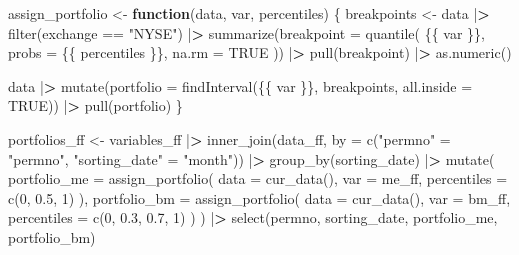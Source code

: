 \documentclass[
]{book}
\newenvironment{Shaded}{\begin{snugshade}}{\end{snugshade}}
\newcommand{\AttributeTok}[1]{\textcolor[rgb]{0.61,0.61,0.61}{#1}}
\newcommand{\ConstantTok}[1]{\textcolor[rgb]{0,0,0}{#1}}
\newcommand{\ControlFlowTok}[1]{\textcolor[rgb]{0.27,0.27,0.27}{\textbf{#1}}}
\newcommand{\DecValTok}[1]{\textcolor[rgb]{0.06,0.06,0.06}{#1}}
\newcommand{\ErrorTok}[1]{\textcolor[rgb]{0.14,0.14,0.14}{\textbf{#1}}}
\newcommand{\FloatTok}[1]{\textcolor[rgb]{0.06,0.06,0.06}{#1}}
\newcommand{\FunctionTok}[1]{\textcolor[rgb]{0,0,0}{#1}}
\newcommand{\NormalTok}[1]{#1}
\newcommand{\OtherTok}[1]{\textcolor[rgb]{0.37,0.37,0.37}{#1}}
\newcommand{\SpecialCharTok}[1]{\textcolor[rgb]{0,0,0}{#1}}
\newcommand{\StringTok}[1]{\textcolor[rgb]{0.5,0.5,0.5}{#1}}
\begin{document}
\begin{Shaded}
\begin{Highlighting}[]
\NormalTok{assign\_portfolio }\OtherTok{\textless{}{-}} \ControlFlowTok{function}\NormalTok{(data, var, percentiles) \{}
\NormalTok{  breakpoints }\OtherTok{\textless{}{-}}\NormalTok{ data }\SpecialCharTok{|}\ErrorTok{\textgreater{}}
    \FunctionTok{filter}\NormalTok{(exchange }\SpecialCharTok{==} \StringTok{"NYSE"}\NormalTok{) }\SpecialCharTok{|}\ErrorTok{\textgreater{}}
    \FunctionTok{summarize}\NormalTok{(}\AttributeTok{breakpoint =} \FunctionTok{quantile}\NormalTok{(}
\NormalTok{      \{\{ var \}\},}
      \AttributeTok{probs =}\NormalTok{ \{\{ percentiles \}\},}
      \AttributeTok{na.rm =} \ConstantTok{TRUE}
\NormalTok{    )) }\SpecialCharTok{|}\ErrorTok{\textgreater{}}
    \FunctionTok{pull}\NormalTok{(breakpoint) }\SpecialCharTok{|}\ErrorTok{\textgreater{}}
    \FunctionTok{as.numeric}\NormalTok{()}

\NormalTok{  data }\SpecialCharTok{|}\ErrorTok{\textgreater{}}
    \FunctionTok{mutate}\NormalTok{(}\AttributeTok{portfolio =} \FunctionTok{findInterval}\NormalTok{(\{\{ var \}\},}
\NormalTok{                                    breakpoints, }\AttributeTok{all.inside =} \ConstantTok{TRUE}\NormalTok{)) }\SpecialCharTok{|}\ErrorTok{\textgreater{}}
    \FunctionTok{pull}\NormalTok{(portfolio)}
\NormalTok{\}}

\NormalTok{portfolios\_ff }\OtherTok{\textless{}{-}}\NormalTok{ variables\_ff }\SpecialCharTok{|}\ErrorTok{\textgreater{}}
  \FunctionTok{inner\_join}\NormalTok{(data\_ff, }\AttributeTok{by =} \FunctionTok{c}\NormalTok{(}\StringTok{"permno"} \OtherTok{=} \StringTok{"permno"}\NormalTok{, }\StringTok{"sorting\_date"} \OtherTok{=} \StringTok{"month"}\NormalTok{)) }\SpecialCharTok{|}\ErrorTok{\textgreater{}}
  \FunctionTok{group\_by}\NormalTok{(sorting\_date) }\SpecialCharTok{|}\ErrorTok{\textgreater{}}
  \FunctionTok{mutate}\NormalTok{(}
    \AttributeTok{portfolio\_me =} \FunctionTok{assign\_portfolio}\NormalTok{(}
      \AttributeTok{data =} \FunctionTok{cur\_data}\NormalTok{(),}
      \AttributeTok{var =}\NormalTok{ me\_ff,}
      \AttributeTok{percentiles =} \FunctionTok{c}\NormalTok{(}\DecValTok{0}\NormalTok{, }\FloatTok{0.5}\NormalTok{, }\DecValTok{1}\NormalTok{)}
\NormalTok{    ),}
    \AttributeTok{portfolio\_bm =} \FunctionTok{assign\_portfolio}\NormalTok{(}
      \AttributeTok{data =} \FunctionTok{cur\_data}\NormalTok{(),}
      \AttributeTok{var =}\NormalTok{ bm\_ff,}
      \AttributeTok{percentiles =} \FunctionTok{c}\NormalTok{(}\DecValTok{0}\NormalTok{, }\FloatTok{0.3}\NormalTok{, }\FloatTok{0.7}\NormalTok{, }\DecValTok{1}\NormalTok{)}
\NormalTok{    )}
\NormalTok{  ) }\SpecialCharTok{|}\ErrorTok{\textgreater{}}
  \FunctionTok{select}\NormalTok{(permno, sorting\_date, portfolio\_me, portfolio\_bm)}
\end{Highlighting}
\end{Shaded}
\end{document}
